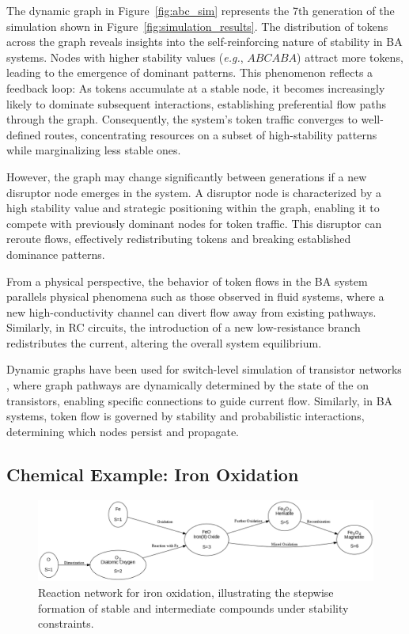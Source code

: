 \documentclass[entropy,article,submit,pdftex,moreauthors]{Definitions/mdpi}
\begin{document}
The dynamic graph in Figure~\ref{fig:abc_sim} represents the 7th generation of the simulation shown in Figure~\ref{fig:simulation_results}. The distribution of tokens across the graph reveals insights into the self-reinforcing nature of stability in BA systems. Nodes with higher stability values (\textit{e.g.}, $ABCABA$) attract more tokens, leading to the emergence of dominant patterns. This phenomenon reflects a feedback loop: As tokens accumulate at a stable node, it becomes increasingly likely to dominate subsequent interactions, establishing preferential flow paths through the graph. Consequently, the system's token traffic converges to well-defined routes, concentrating resources on a subset of high-stability patterns while marginalizing less stable ones.

However, the graph may change significantly between generations if a new disruptor node emerges in the system. A disruptor node is characterized by a high stability value and strategic positioning within the graph, enabling it to compete with previously dominant nodes for token traffic. This disruptor can reroute flows, effectively redistributing tokens and breaking established dominance patterns. 

From a physical perspective, the behavior of token flows in the BA system parallels physical phenomena such as those observed in fluid systems, where a new high-conductivity channel can divert flow away from existing pathways. Similarly, in RC circuits, the introduction of a new low-resistance branch redistributes the current, altering the overall system equilibrium. 

Dynamic graphs have been used for switch-level simulation of transistor networks \cite{AdlerCAD}, where graph pathways are dynamically determined by the state of the on transistors, enabling specific connections to guide current flow. Similarly, in BA systems, token flow is governed by stability and probabilistic interactions, determining which nodes persist and propagate.

\subsection{Chemical Example: Iron Oxidation}

\begin{figure}[h]
    \centering
    \includegraphics[width=1\textwidth,height=0.4\textwidth]{abc_oxi.png}
    \caption{Reaction network for iron oxidation, illustrating the stepwise formation of stable and intermediate compounds under stability constraints.}
    \label{fig:abc_oxi}
\end{figure}
\end{document}
